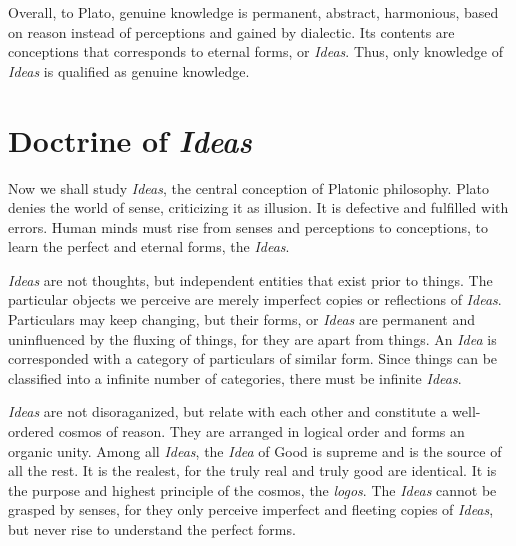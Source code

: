 \documentclass[11pt]{article}
\begin{document}
\newline

Overall, to Plato, genuine knowledge is permanent, abstract, harmonious, based on reason instead of perceptions and gained by dialectic. 
Its contents are conceptions that corresponds to eternal forms, or \textit{Ideas}. 
Thus, only knowledge of \textit{Ideas} is qualified as genuine knowledge.
  

\section{Doctrine of \textit{Ideas}}
Now we shall study \textit{Ideas}, the central conception of Platonic philosophy. 
Plato denies the world of sense, criticizing it as illusion. 
It is defective and fulfilled with errors. 
Human minds must rise from senses and perceptions to conceptions, to learn the perfect and eternal forms, the \textit{Ideas}. 

\newline

\textit{Ideas} are not thoughts, but independent entities that exist prior to things. 
The particular objects we perceive are merely imperfect copies or reflections of \textit{Ideas}. 
Particulars may keep changing, but their forms, or \textit{Ideas} are permanent and uninfluenced by the fluxing of things, for they are apart from things. 
An \textit{Idea} is corresponded with a category of particulars of similar form. 
Since things can be classified into a infinite number of categories, there must be infinite \textit{Ideas}.

\newline

\textit{Ideas} are not disoraganized, but relate with each other and constitute a well-ordered cosmos of reason. 
They are arranged in logical order and forms an organic unity. 
Among all \textit{Ideas}, the \textit{Idea} of Good is supreme and is the source of all the rest. 
It is the realest, for the truly real and truly good are identical. 
It is the purpose and highest principle of the cosmos, the \textit{logos}. 
The \textit{Ideas} cannot be grasped by senses, for they only perceive imperfect and fleeting copies of \textit{Ideas}, but never rise to understand the perfect forms.

\newline
\end{document}

